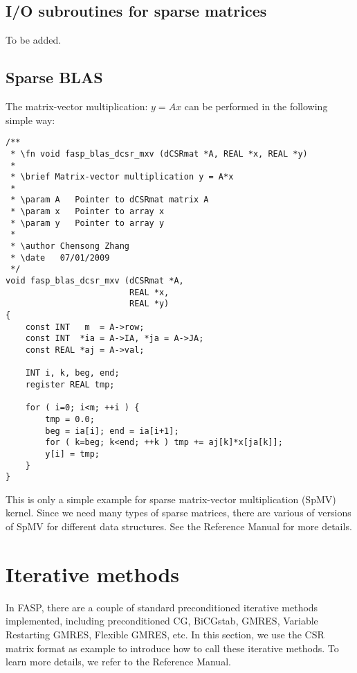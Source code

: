 \documentclass[11pt]{memoir}
\begin{document}
\subsection{I/O subroutines for sparse matrices}

To be added.


\subsection{Sparse BLAS}

The matrix-vector multiplication: $y=Ax$ can be performed in the
following simple way:

\begin{lstlisting}
/**
 * \fn void fasp_blas_dcsr_mxv (dCSRmat *A, REAL *x, REAL *y)
 *
 * \brief Matrix-vector multiplication y = A*x
 *
 * \param A   Pointer to dCSRmat matrix A
 * \param x   Pointer to array x
 * \param y   Pointer to array y
 *
 * \author Chensong Zhang
 * \date   07/01/2009
 */
void fasp_blas_dcsr_mxv (dCSRmat *A,
                         REAL *x,
                         REAL *y)
{
    const INT   m  = A->row;
    const INT  *ia = A->IA, *ja = A->JA;
    const REAL *aj = A->val;

    INT i, k, beg, end;
    register REAL tmp;

    for ( i=0; i<m; ++i ) {
        tmp = 0.0;
        beg = ia[i]; end = ia[i+1];
        for ( k=beg; k<end; ++k ) tmp += aj[k]*x[ja[k]];
        y[i] = tmp;
    }
}
\end{lstlisting}

This is only a simple example for sparse matrix-vector multiplication (SpMV) kernel. Since we need many types of sparse matrices, there are various of versions of SpMV for different data structures. See the Reference Manual for more details.

\section{Iterative methods}\label{sec:iter}

In FASP, there are a couple of standard preconditioned iterative methods
~\cite{Saad.Saad.2003fv} implemented, including preconditioned CG, BiCGstab, GMRES, Variable Restarting GMRES, Flexible GMRES, etc. In this section, we use the CSR matrix format as example to introduce how to call these iterative methods. To learn more details, we refer to the Reference Manual.
\end{document}
